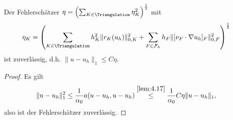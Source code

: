 \begin{Folgerung}
    \label{folgerung:4.18}
    Der Fehlerschätzer $\eta = \left(\sum_{K\in\Triangulation} \eta_K^2\right)
    ^\frac{1}{2}$ mit
    \begin{eqnarray*}
          \eta_K
        = \left(\sum_{K\in\Triangulation} h_K^2 \|r_K(u_h)\|_{0,K}^2
          + \sum_{F\in\mathcal{F}_h} h_F
          \|[\nu_F \cdot \nabla u_h]_F\|_{0,F}^2\right)^\frac{1}{2}
    \end{eqnarray*}
    ist zuverlässig, d.h. $\|u - u_h\|_1 \le C \eta$.
\end{Folgerung}


\begin{proof}
    Es gilt
    \begin{eqnarray*}
            \|u - u_h\|_1^2
        \le \frac{1}{\alpha_0} a(u - u_h, u - u_h)
        \stackrel{\eqref{lem:4.17}}{\le} \frac{1}{\alpha_0} C \eta \|u - u_h\|_1
        ,
    \end{eqnarray*}
    also ist der Fehlerschätzer zuverlässig.
\end{proof}
